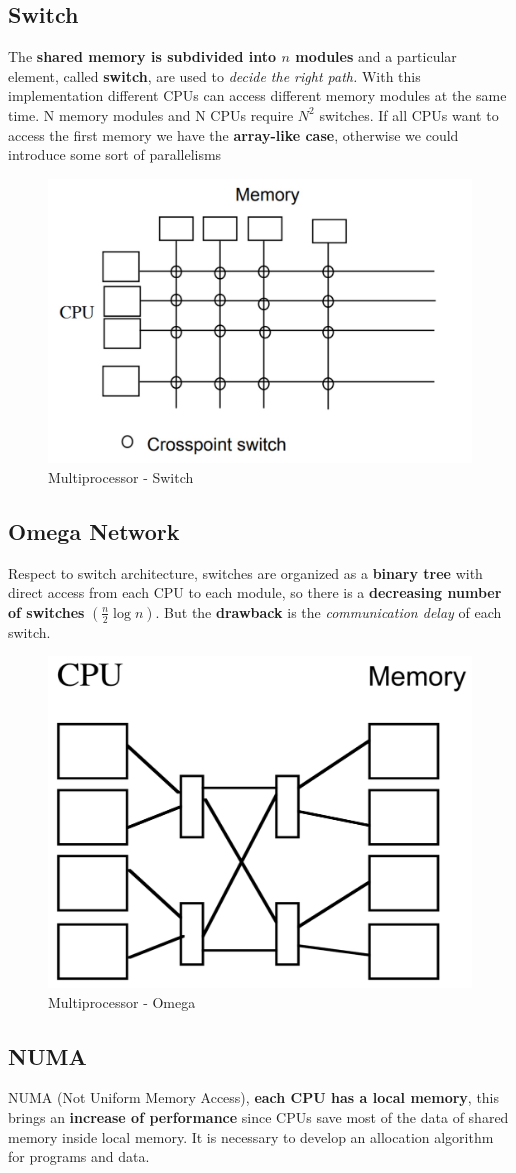 \subsection{Switch}
The \textbf{shared memory is subdivided into \(n\) modules} and a particular element, called \textbf{switch}, are used to \textit{decide the right path.} With this implementation different CPUs can access different memory modules at the same time. N memory modules and N CPUs require \(N^2\) switches. If all CPUs want to access the first memory we have the \textbf{array-like case}, otherwise we could introduce some sort of parallelisms
\begin{figure}[!h]
            \centering
            \includegraphics[width=.45\linewidth]{images/distributedSystem/switch.jpeg}
            \caption{Multiprocessor - Switch}
    \end{figure}

\subsection{Omega Network}
Respect to switch architecture, switches are organized as a \textbf{binary tree} with direct access from each CPU to each module, so there is a \textbf{decreasing number of switches} \((\frac{n}{2} \log n)\). But the \textbf{drawback} is the \textit{communication delay} of each switch.
\begin{figure}[!h]
            \centering
            \includegraphics[width=.35\linewidth]{images/distributedSystem/numa.jpeg}
            \caption{Multiprocessor - Omega}
    \end{figure}

\subsection{NUMA}
NUMA (Not Uniform Memory Access), \textbf{each CPU has a local memory}, this brings an \textbf{increase of performance} since CPUs save most of the data of shared memory inside local memory. It is necessary to develop an allocation algorithm for programs and data. 


